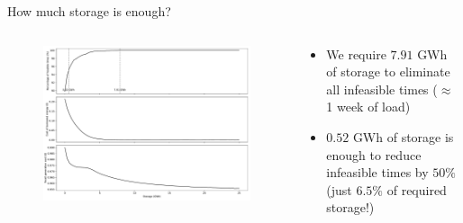 \documentclass[aspectratio=169,11pt]{beamer}
\begin{document}
\begin{frame}{How much storage is enough?}
\begin{columns}
    \begin{column}{0.6\textwidth}
        \begin{figure}
            \centering
            \includegraphics[width=\columnwidth]{./figures/storage_enough.pdf}
        \end{figure}
    \end{column}
    \begin{column}{0.4\textwidth}
        \begin{table}[ht]
            \centering
        \end{table}
        \begin{itemize}
            \item We require $7.91$ GWh of storage to eliminate all infeasible times ($\approx$ 1 week of load)
            \item $0.52$ GWh of storage is enough to reduce infeasible times by $50\%$ (just $6.5\%$ of required storage!)
        \end{itemize}
    \end{column}
\end{columns}
\end{frame}
\end{document}
